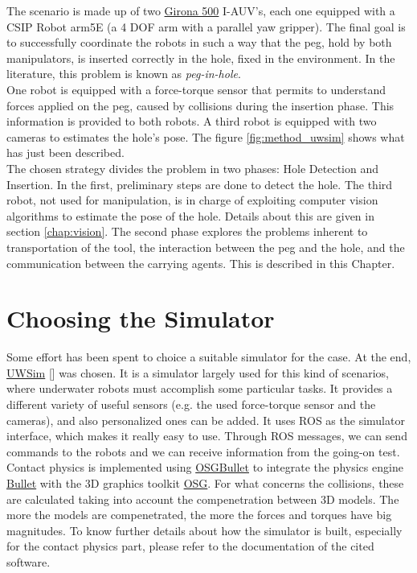 The scenario is made up of two \href{https://cirs.udg.edu/auvs-technology/auvs/girona-500-auv/}{Girona 500} I-AUV's, each one equipped with a CSIP Robot arm5E (a 4 DOF arm with a parallel yaw gripper). The final goal is to successfully coordinate the robots in such a way that the peg, hold by both manipulators, is inserted correctly in the hole, fixed in the environment. In the literature, this problem is known as \textit{peg-in-hole}.\\
One robot is equipped with a force-torque sensor that permits to understand forces applied on the peg, caused by collisions during the insertion phase. This information is provided to both robots. A third robot is equipped with two cameras to estimates the hole's pose. The figure \ref{fig:method_uwsim} shows what has just been described.\\
The chosen strategy divides the problem in two phases: Hole Detection and Insertion. In the first, preliminary steps are done to detect the hole. The third robot, not used for manipulation, is in charge of exploiting computer vision algorithms to estimate the pose of the hole. Details about this are given in section \ref{chap:vision}.
The second phase explores the problems inherent to transportation of the tool, the interaction between the peg and the hole, and the communication between the carrying agents. This is described in this Chapter.

\section{Choosing the Simulator}
\label{sec:simulators}
Some effort has been spent to choice a suitable simulator for the case. At the end, \href{http://www.irs.uji.es/uwsim/}{UWSim} [\cite{uwsim}] was chosen. It is a simulator largely used for this kind of scenarios, where underwater robots must accomplish some particular tasks. It provides a different variety of useful sensors (e.g. the used force-torque sensor and the cameras), and also personalized ones can be added. It uses ROS as the simulator interface, which makes it really easy to use. Through ROS messages, we can send commands to the robots and we can receive information from the going-on test. Contact physics is implemented using \href{https://github.com/mccdo/osgbullet}{OSGBullet} to integrate the physics engine \href{https://pybullet.org/wordpress/}{Bullet} with the 3D graphics toolkit \href{http://www.openscenegraph.org/}{OSG}. For what concerns the collisions, these are calculated taking into account the compenetration between 3D models. The more the models are compenetrated, the more the forces and torques have big magnitudes. To know further details about how the simulator is built, especially for the contact physics part, please refer to the documentation of the cited software.\\

